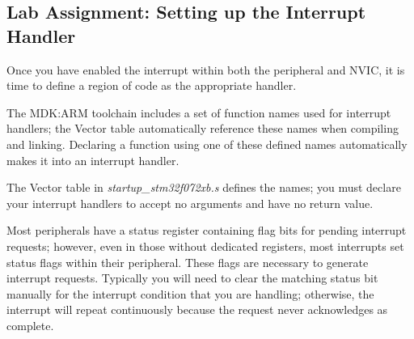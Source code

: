 \documentclass[11pt,fleqn]{book} %
\makeatletter
\newcommand{\ilcode}[1]{
    \smallskip
    \colorbox{gray!20!white}{
        \centering
        \parbox{\linewidth-2\fboxsep}{
            \lstinline@#1@
        }
    }
}
\makeatother
\begin{document}
%    
%    
%    
%    
%    



\subsection{\color{blue}Lab Assignment: Setting up the Interrupt Handler}  \label{handler_setup}
Once you have enabled the interrupt within both the peripheral and NVIC, it is time to define a region of code as the appropriate handler. 

The MDK:ARM toolchain includes a set of function names used for interrupt handlers; the Vector table automatically reference these names when compiling and linking. Declaring a function using one of these defined names automatically makes it into an interrupt handler.

The Vector table in \textit{startup\_stm32f072xb.s} defines the names; you must declare your interrupt handlers to accept no arguments and have no return value. 

Most peripherals have a status register containing flag bits for pending interrupt requests; however, even in those without dedicated registers, most interrupts set status flags within their peripheral. These flags are necessary to generate interrupt requests. Typically you will need to clear the matching status bit manually for the interrupt condition that you are handling; otherwise, the interrupt will repeat continuously because the request never acknowledges as complete. 
\end{document}

